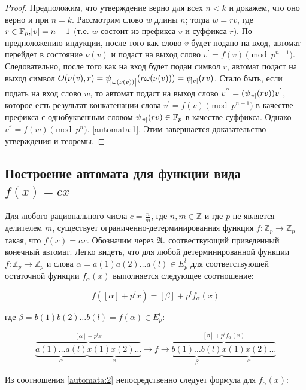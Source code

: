 \documentclass[och, master]{SCWorks}
\theoremstyle{plain}
\theoremstyle{plain}
\theoremstyle{plain}
\theoremstyle{definition}
\begin{document}
\begin{proof}
Предположим, что утверждение верно для всех $n < k$ и докажем, что оно верно и при $n = k$. Рассмотрим слово $w$ длины $n$; тогда $w = rv$, где $r \in \mathbb F_p, \abs{v} = n-1$ (т.е. $w$ состоит из префикса $v$ и суффикса $r$). По предположению индукции, после того как слово $v$ будет подано на вход, автомат перейдет в состояние $\nu(v)$ и подаст на выход слово $v^{'} = f(v)\pmod {p^{n-1}}$. Следовательно, после того как на вход будет подан символ $r$, автомат подаст на выход символ $O(\nu(v), r) = \psi_{\abs{\omega(\nu(v))}}(r\omega(\nu(v)))=\psi_{\abs{v}}(rv)$. Стало быть, если подать на вход слово $w$, то автомат подаст на выход слово $v^{''} = (\psi_{\abs{v}}(rv))v^{'}$, которое есть результат конкатенации слова $v^{'} = f(v) \pmod {p^{n-1}}$ в качестве префикса с однобуквенным словом $\psi_{\abs{v}}(rv) \in \mathbb F_p$ в качестве суффикса. Однако $v^{''} = f(w) \pmod {p^n}$. \eqref{automata:1}. Этим завершается доказательство утверждения и теоремы.	
\end{proof}


\subsection{Построение автомата для функции вида $f(x)=cx$}
Для любого рационального числа $c=\frac{n}{m}$, где $n,m \in \mathbb Z$ и где $p$ не является делителем $m$, существует ограниченно-детерминированная функция $f: \mathbb Z_p \rightarrow \mathbb Z_p$ такая, что $f(x)=cx$. Обозначим через $\mathfrak{A}_c$ соотвествующий приведенный конечный автомат. Легко видеть, что для любой детерминированной функции $f: \mathbb Z_p \rightarrow \mathbb Z_p$ и слова $\alpha=a(1)a(2)\ldots a(l) \in E^l_p$ для соответствующей остаточной функции $f_\alpha (x)$ выполняется следующее соотношение:

\begin{equation} \label{automata:2}
f([\alpha]+p^lx)=[\beta]+p^l f_{\alpha}(x)
\end{equation}

\noindent где $\beta=b(1)b(2)\ldots b(l) =f(\alpha) \in E^l_p$:

\begin{equation} \label{automata:3}
\overbrace{\underbrace{a(1)\ldots a(l)}_{\alpha} \underbrace{x(1)x(2)\ldots}_{x}}^{[\alpha]+p^{l}x} \rightarrow
\boxed{f} \rightarrow \overbrace{\underbrace{b(1)\ldots b(l)}_{\beta} \underbrace{x(1)x(2)\ldots}_{x}}^{[\beta]+p^{l}f_{\alpha}(x)}
\end{equation}


\noindent Из соотношения \ref{automata:2} непосредственно следует формула для $f_{\alpha}(x)$:
\end{document}
